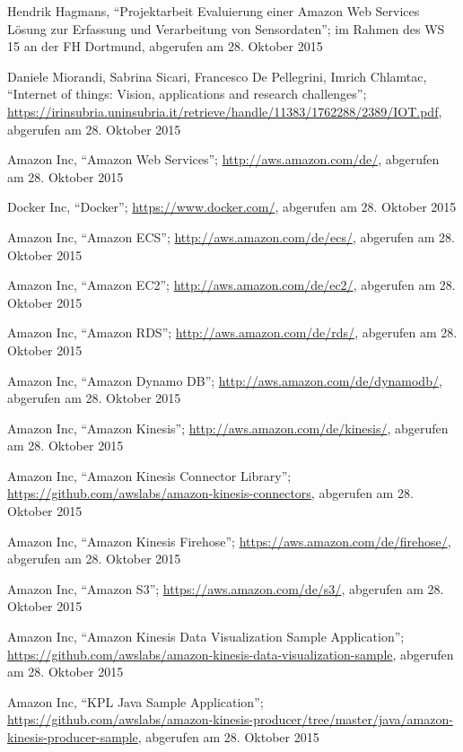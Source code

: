 \begin{thebibliography}{1}


Hendrik Hagmans, ``Projektarbeit Evaluierung einer Amazon Web Services Lösung zur Erfassung und Verarbeitung von Sensordaten''; im Rahmen des WS 15 an der FH Dortmund, abgerufen am 28. Oktober 2015

Daniele Miorandi, Sabrina Sicari, Francesco De Pellegrini, Imrich Chlamtac, ``Internet of things: Vision, applications and research challenges''; \url{https://irinsubria.uninsubria.it/retrieve/handle/11383/1762288/2389/IOT.pdf}, abgerufen am 28. Oktober 2015

Amazon Inc, ``Amazon Web Services''; \url{http://aws.amazon.com/de/}, abgerufen am 28. Oktober 2015

Docker Inc, ``Docker''; \url{https://www.docker.com/}, abgerufen am 28. Oktober 2015

Amazon Inc, ``Amazon ECS''; \url{http://aws.amazon.com/de/ecs/}, abgerufen am 28. Oktober 2015

Amazon Inc, ``Amazon EC2''; \url{http://aws.amazon.com/de/ec2/}, abgerufen am 28. Oktober 2015

Amazon Inc, ``Amazon RDS''; \url{http://aws.amazon.com/de/rds/}, abgerufen am 28.
Oktober 2015

Amazon Inc, ``Amazon Dynamo DB''; \url{http://aws.amazon.com/de/dynamodb/}, abgerufen am 28. Oktober 2015

Amazon Inc, ``Amazon Kinesis''; \url{http://aws.amazon.com/de/kinesis/}, abgerufen am 28. Oktober 2015

Amazon Inc, ``Amazon Kinesis Connector Library''; \url{https://github.com/awslabs/amazon-kinesis-connectors}, abgerufen am 28. Oktober 2015

Amazon Inc, ``Amazon Kinesis Firehose''; \url{https://aws.amazon.com/de/firehose/}, abgerufen am 28. Oktober 2015

Amazon Inc, ``Amazon S3''; \url{https://aws.amazon.com/de/s3/}, abgerufen am 28. Oktober 2015

Amazon Inc, ``Amazon Kinesis Data Visualization Sample Application''; \url{https://github.com/awslabs/amazon-kinesis-data-visualization-sample}, abgerufen am 28. Oktober 2015

Amazon Inc, ``KPL Java Sample Application''; \url{https://github.com/awslabs/amazon-kinesis-producer/tree/master/java/amazon-kinesis-producer-sample}, abgerufen am 28. Oktober 2015


\end{thebibliography}
